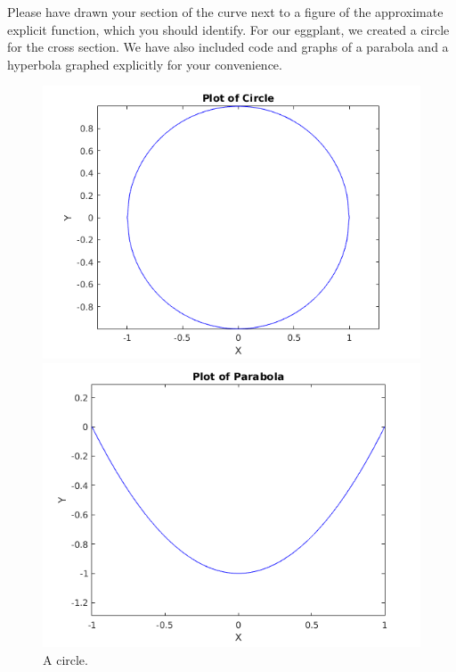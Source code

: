 \documentclass{article}
\begin{document}
Please have drawn your section of the curve next to a figure of the approximate explicit function, which you should identify. For our eggplant, we created a circle for the cross section. We have also included code and graphs of a parabola and a hyperbola graphed explicitly for your convenience.



\begin{figure}
    \centering
        \begin{minipage}{0.3\textwidth}
            \centering
            \includegraphics[width=\linewidth]{figs_and_code/circle.png}
            \caption{A circle.}
        \end{minipage}\hfill
        \begin{minipage}{0.3\textwidth}
            \centering
            \includegraphics[width=\linewidth]{figs_and_code/parab.png}

\end{minipage}
\end{figure}
\end{document}
